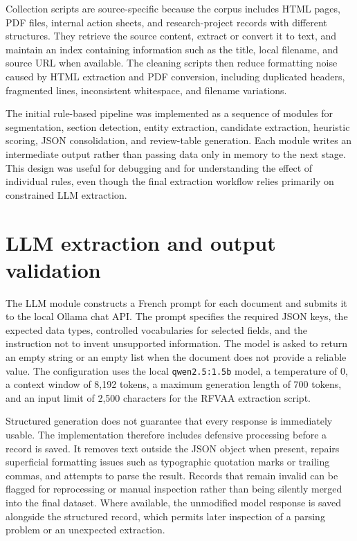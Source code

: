 Collection scripts are source-specific because the corpus includes HTML pages,
PDF files, internal action sheets, and research-project records with different
structures. They retrieve the source content, extract or convert it to text,
and maintain an index containing information such as the title, local filename,
and source URL when available. The cleaning scripts then reduce formatting noise
caused by HTML extraction and PDF conversion, including duplicated headers,
fragmented lines, inconsistent whitespace, and filename variations.

The initial rule-based pipeline was implemented as a sequence of modules for
segmentation, section detection, entity extraction, candidate extraction,
heuristic scoring, JSON consolidation, and review-table generation. Each module
writes an intermediate output rather than passing data only in memory to the
next stage. This design was useful for debugging and for understanding the
effect of individual rules, even though the final extraction workflow relies
primarily on constrained LLM extraction.

\section{LLM extraction and output validation}

The LLM module constructs a French prompt for each document and submits it to
the local Ollama chat API. The prompt specifies the required JSON keys, the
expected data types, controlled vocabularies for selected fields, and the
instruction not to invent unsupported information. The model is asked to return
an empty string or an empty list when the document does not provide a reliable
value. The configuration uses the local \texttt{qwen2.5:1.5b} model, a
temperature of 0, a context window of 8,192 tokens, a maximum generation length
of 700 tokens, and an input limit of 2,500 characters for the RFVAA extraction
script.

Structured generation does not guarantee that every response is immediately
usable. The implementation therefore includes defensive processing before a
record is saved. It removes text outside the JSON object when present, repairs
superficial formatting issues such as typographic quotation marks or trailing
commas, and attempts to parse the result. Records that remain invalid can be
flagged for reprocessing or manual inspection rather than being silently merged
into the final dataset. Where available, the unmodified model response is saved
alongside the structured record, which permits later inspection of a parsing
problem or an unexpected extraction.

